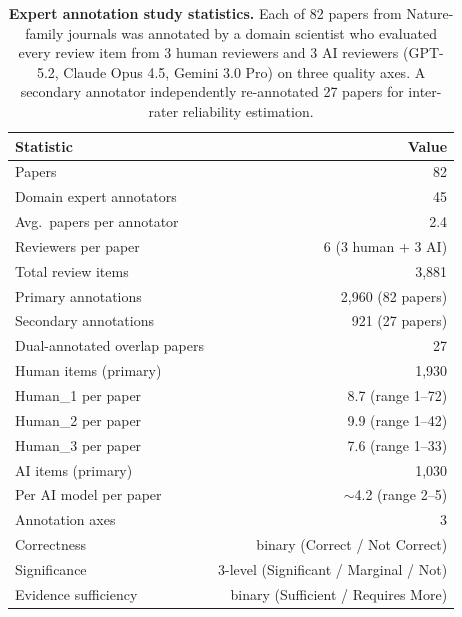 \begin{table}[t]
\centering
\fontsize{8}{10.5}\selectfont
\setlength{\tabcolsep}{5pt}
\begin{tabular}{lr}
\toprule
\textbf{Statistic} & \textbf{Value} \\
\midrule
Papers & 82 \\
Domain expert annotators & 45 \\
Avg.\ papers per annotator & 2.4 \\
Reviewers per paper & 6 (3 human + 3 AI) \\
\midrule
Total review items & 3{,}881 \\
\quad Primary annotations & 2{,}960 (82 papers) \\
\quad Secondary annotations & 921 (27 papers) \\
Dual-annotated overlap papers & 27 \\
\midrule
Human items (primary) & 1{,}930 \\
\quad Human\_1 per paper & 8.7 (range 1--72) \\
\quad Human\_2 per paper & 9.9 (range 1--42) \\
\quad Human\_3 per paper & 7.6 (range 1--33) \\
AI items (primary) & 1{,}030 \\
\quad Per AI model per paper & ${\sim}$4.2 (range 2--5) \\
\midrule
Annotation axes & 3 \\
\quad Correctness & binary (Correct / Not Correct) \\
\quad Significance & 3-level (Significant / Marginal / Not) \\
\quad Evidence sufficiency & binary (Sufficient / Requires More) \\
\bottomrule
\end{tabular}
\caption{\textbf{Expert annotation study statistics.}
Each of 82 papers from Nature-family journals was annotated by a domain scientist who evaluated every review item from 3 human reviewers and 3 AI reviewers (GPT-5.2, Claude Opus 4.5, Gemini 3.0 Pro) on three quality axes.
A secondary annotator independently re-annotated 27 papers for inter-rater reliability estimation.
}
\label{tab:stats-human-study}
\end{table}
